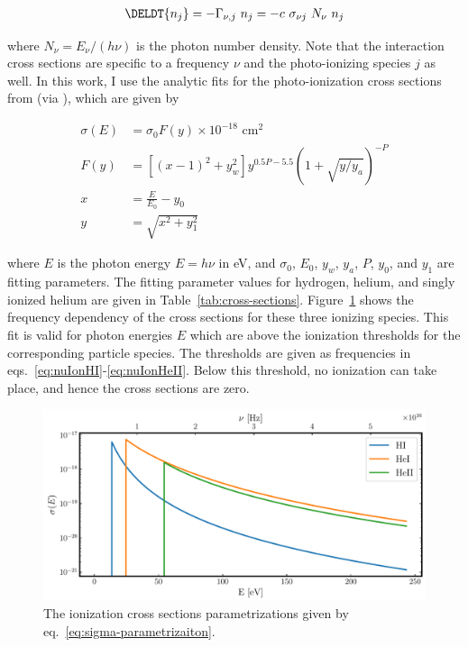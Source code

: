 \begin{align}
   \DELDT{n_j} = -\Gamma_{\nu, j} \ n_j = - c \ \sigma_{\nu j} \ N_\nu \ n_j
\end{align}

where $N_\nu = E_\nu / (h \nu)$ is the photon number density. Note that the interaction cross
sections are specific to a frequency $\nu$ and the photo-ionizing species $j$ as well. In this work,
I use the analytic fits for the photo-ionization cross sections from
\cite{vernerAtomicDataAstrophysics1996} (via \cite{ramses-rt13}), which are given by

\begin{align}
\sigma(E) &= \sigma_0 F(y) \times 10^{-18} \text{ cm}^2  \label{eq:sigma-parametrizaiton}
\\
F(y) &= \left[(x - 1)^2 + y_w^2 \right] y ^{0.5 P - 5.5} \left( 1 + \sqrt{y / y_a} \right)^{-P}
\\
x &= \frac{E}{E_0} - y_0 \\
y &= \sqrt{x^2 + y_1^2}
\end{align}

where $E$ is the photon energy $E = h \nu$ in eV, and $\sigma_0$, $E_0$, $y_w$, $y_a$, $P$, $y_0$,
and $y_1$ are fitting parameters. The fitting parameter values for hydrogen, helium, and singly
ionized helium are given in Table~\ref{tab:cross-sections}. Figure~\ref{fig:cross-sections} shows
the frequency dependency of the cross sections for these three ionizing species. This fit is valid
for photon energies $E$ which are above the ionization thresholds for the corresponding particle
species. The thresholds are given as frequencies in eqs.~\ref{eq:nuIonHI}-\ref{eq:nuIonHeII}. Below
this threshold, no ionization can take place, and hence the cross sections are zero.




\begin{figure}
 \centering
 \includegraphics[width=\linewidth]{figures/RHD/cross_sections.pdf}%
\caption{The ionization cross sections parametrizations given by eq.~\ref{eq:sigma-parametrizaiton}.
}
\label{fig:cross-sections}
\end{figure}






